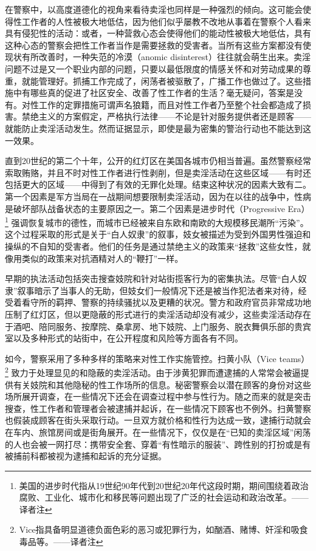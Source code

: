 \documentclass[fontset=fandol, a4paper, 12pt, openright]{ctexbook}
\begin{document}
在警察中，以高度道德化的视角来看待卖淫也同样是一种强烈的倾向。这可能会使得性工作者的人性被极大地低估，因为他们似乎屡教不改地从事着在警察个人看来具有侵犯性的活动：或者，一种营救心态会使得他们的能动性被极大地低估，具有这种心态的警察会把性工作者当作是需要拯救的受害者。当所有这些方案都没有使现状有所改善时，一种失范的冷漠（anomic disinterest）往往就会萌生出来。卖淫问题不过是又一个职业内部的问题，只要以最低限度的情感关怀和对劳动成果的尊重，就能管理好。抓捕工作完成了，闲荡者被驱散了，广播工作也做过了。这些措施中有哪些真的促进了社区安全、改善了性工作者的生活？毫无疑问，答案是没有。对性工作的定罪措施可谓声名狼籍，而且对性工作者乃至整个社会都造成了损害。禁绝主义的方案假定，严格执行法律——不论是针对服务提供者还是顾客——就能防止卖淫活动发生。然而证据显示，即使是最为密集的警治行动也不能达到这一效果。

直到20世纪的第二个十年，公开的红灯区在美国各城市仍相当普遍。虽然警察经常索取贿赂，并且不时对性工作者进行性剥削，但是卖淫活动在这些区域——有时还包括更大的区域——中得到了有效的无罪化处理。结束这种状况的因素大致有二。第一个因素是军方当局在一战期间想要限制卖淫活动，因为在以往的战争中，性病是破坏部队战备状态的主要原因之一。第二个因素是进步时代（Progressive Era）\footnote{美国的进步时代指从19世纪90年代到20世纪20年代这段时期，期间围绕着政治腐败、工业化、城市化和移民等问题出现了广泛的社会运动和政治改革。——译者注} 强调恢复城市的德性，而城市已经被来自东欧和南欧的大规模移民潮所“污染”。这个过程采取的形式是关于“白人奴隶”的叙事，妓女被描述为受到外国男性强迫和操纵的不自知的受害者。他们的任务是通过禁绝主义的政策来“拯救”这些女性，就像用类似的政策来对抗酒精对人的“鞭打”一样。

早期的执法活动包括突击搜查妓院和针对站街揽客行为的密集执法。尽管“白人奴隶”叙事暗示了当事人的无助，但妓女们一般情况下还是被当作犯法者来对待，经受着看守所的羁押、警察的持续骚扰以及更糟的状况。警方和政府官员非常成功地压制了红灯区，但以更隐蔽的形式进行的卖淫活动却没有减少，这些卖淫活动存在于酒吧、陪同服务、按摩院、桑拿房、地下妓院、上门服务、脱衣舞俱乐部的贵宾室以及多种形式的站街中，在公开程度和风险等方面各有不同。

如今，警察采用了多种多样的策略来对性工作实施管控。扫黄小队（Vice teams）\footnote{Vice指具备明显道德负面色彩的恶习或犯罪行为，如酗酒、赌博、奸淫和吸食毒品等。——译者注} 致力于处理显见的和隐蔽的卖淫活动。由于涉黄犯罪而遭逮捕的人常常会被逼提供有关妓院和其他隐秘的性工作场所的信息。秘密警察会以潜在顾客的身份对这些场所展开调查，在一些情况下还会在调查过程中参与性行为。随之而来的就是突击搜查，性工作者和管理者会被逮捕并起诉，在一些情况下顾客也不例外。扫黄警察也假装成顾客在街头采取行动。一旦双方就价格和性行为达成一致，逮捕行动就会在车内、旅馆房间或是街角展开。在一些情况下，仅仅是在“已知的卖淫区域”闲荡的人也会被一网打尽：携带安全套、穿着“有性暗示的服装”、跨性别的打扮或是有被捕前科都被视为逮捕和起诉的充分证据。
\end{document}
